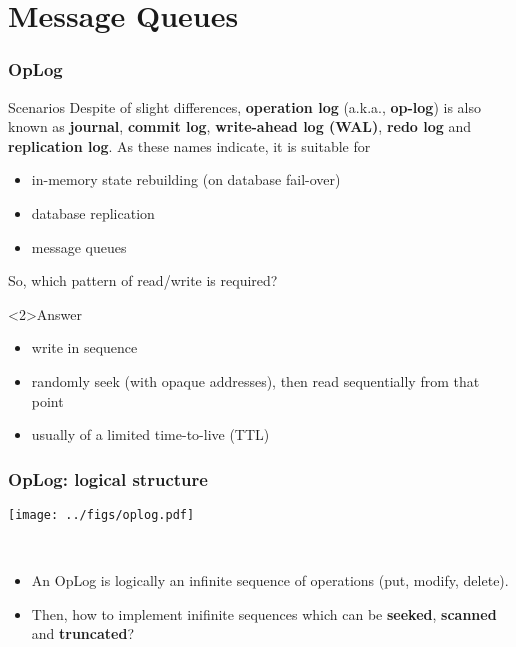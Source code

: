 \documentclass[lualatex]{beamer}
\renewcommand{\emph}{\textbf}
\begin{document}
\section{Message Queues}
\frame{\tableofcontents[currentsection]}

\begin{frame}
  \frametitle{OpLog}

  \begin{block}{Scenarios}
    Despite of slight differences,
    \emph{operation log} (a.k.a., \emph{op-log}) is also known as
    \emph{journal}, \emph{commit log}, \emph{write-ahead log (WAL)},
    \emph{redo log} and \emph{replication log}.
    As these names indicate, it is suitable for
    \begin{itemize}
      \item in-memory state rebuilding (on database fail-over)
      \item database replication
      \item message queues
    \end{itemize}
    So, which pattern of read/write is required?
  \end{block}
  \begin{exampleblock}<2>{Answer}
    \begin{itemize}
      \item write in sequence
      \item randomly seek (with opaque addresses), then read sequentially from that point
      \item usually of a limited time-to-live (TTL)
    \end{itemize}
  \end{exampleblock}
\end{frame}

\begin{frame}
  \frametitle{OpLog: logical structure}
  \begin{center}
    \texttt{[image: ../figs/oplog.pdf]}
  \end{center}
  \begin{block}{~}
    \begin{itemize}
      \item An OpLog is logically an infinite sequence of operations (put, modify, delete).
      \item Then, how to implement inifinite sequences which can be \emph{seeked}, \emph{scanned} and \emph{truncated}?
    \end{itemize}
  \end{block}
\end{frame}
\end{document}

